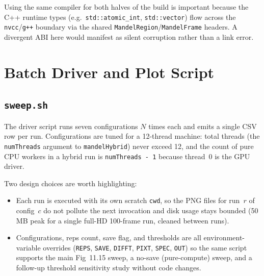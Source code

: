 \documentclass[
	english,
	letterpaper, oneside
]{article}
\begin{document}
Using the same compiler for both halves of the build is important
because the C++ runtime types (e.g.\ \texttt{std::atomic\_int},
\texttt{std::vector}) flow across the
\texttt{nvcc}/\texttt{g++} boundary via the shared
\texttt{MandelRegion}/\texttt{MandelFrame} headers. A divergent ABI here
would manifest as silent corruption rather than a link error.

\section{Batch Driver and Plot Script}

\subsection{\texttt{sweep.sh}}

The driver script runs seven configurations $N$ times each and emits a
single CSV row per run. Configurations are tuned for a 12-thread
machine: total threads (the \texttt{numThreads} argument to
\texttt{mandelHybrid}) never exceed 12, and the count of pure CPU
workers in a hybrid run is \texttt{numThreads - 1} because thread~0 is
the GPU driver.


Two design choices are worth highlighting:

\begin{itemize}
    \item Each run is executed with its own scratch \texttt{cwd}, so
    the PNG files for run~$r$ of config~$c$ do not pollute the next
    invocation and disk usage stays bounded (50\,MB peak for a single
    full-HD 100-frame run, cleaned between runs).
    \item Configurations, reps count, save flag, and thresholds are all
    environment-variable overrides
    (\texttt{REPS}, \texttt{SAVE}, \texttt{DIFFT}, \texttt{PIXT},
    \texttt{SPEC}, \texttt{OUT}) so the same script supports the main
    Fig~11.15 sweep, a no-save (pure-compute) sweep, and a follow-up
    threshold sensitivity study without code changes.
\end{itemize}
\end{document}
